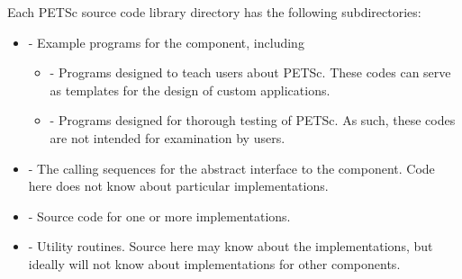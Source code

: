 Each PETSc source code library directory has the following subdirectories:
\begin{itemize}
\item  {} - Example programs for the component, including
  \begin{itemize}
  \item {} - Programs designed to teach users about PETSc.  These
          codes can serve as templates for the design of custom applications.
  \item {} - Programs designed for thorough testing of PETSc.  As such,
          these codes are not intended for examination by users.
  \end{itemize}
\item  {} - The calling sequences for the abstract interface  
        to the component.
        Code here does not know about particular implementations.
\item  {} - Source code for one or more implementations.
\item  {} - Utility routines.  Source here may know about the 
          implementations, but ideally will not know about implementations
          for other components.
\end{itemize}

%
%


